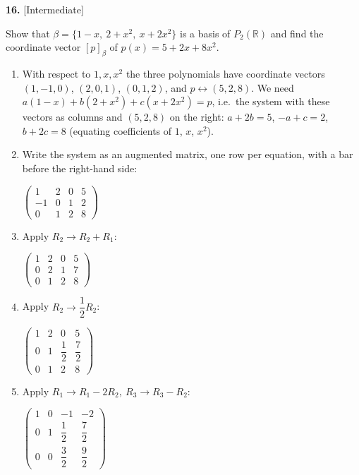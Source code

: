 \documentclass[11pt]{article}
\begin{document}
\par\vspace{2pt}
\begin{minipage}{\linewidth}\textbf{16.} \hfill{\scriptsize\color{ink}[Intermediate]}\par\nopagebreak Show that $\beta=\{1-x,\ 2+x^{2},\ x+2x^{2}\}$ is a basis of $P_2(\mathbb{R})$ and find the coordinate vector $[p]_\beta$ of $p(x)=5+2x+8x^{2}$.
\end{minipage}\par\nopagebreak
\begin{tcolorbox}[breakable,colback=ans,colframe=ansb,boxrule=0.5pt,left=4pt,right=4pt,top=2pt,bottom=2pt]\begin{enumerate}[leftmargin=3.1em,itemsep=1pt,topsep=1pt,label=\textbf{Step \arabic*.}]\item With respect to $1,x,x^{2}$ the three polynomials have coordinate vectors $(1,-1,0)$, $(2,0,1)$, $(0,1,2)$, and $p\leftrightarrow(5,2,8)$. We need $a(1-x)+b(2+x^{2})+c(x+2x^{2})=p$, i.e.\ the system with these vectors as columns and $(5,2,8)$ on the right: $a+2b=5$, $-a+c=2$, $b+2c=8$ (equating coefficients of $1$, $x$, $x^{2}$).
\item Write the system as an augmented matrix, one row per equation, with a bar before the right-hand side:\par\smallskip $\displaystyle \left(\begin{array}{ccc|c}1 & 2 & 0 & 5 \\ -1 & 0 & 1 & 2 \\ 0 & 1 & 2 & 8\end{array}\right)$
\item Apply $R_2\to R_2+R_1$:\par\smallskip $\displaystyle \left(\begin{array}{ccc|c}1 & 2 & 0 & 5 \\ 0 & 2 & 1 & 7 \\ 0 & 1 & 2 & 8\end{array}\right)$
\item Apply $R_2\to \dfrac{1}{2} R_2$:\par\smallskip $\displaystyle \left(\begin{array}{ccc|c}1 & 2 & 0 & 5 \\ 0 & 1 & \dfrac{1}{2} & \dfrac{7}{2} \\ 0 & 1 & 2 & 8\end{array}\right)$
\item Apply $R_1\to R_1-2R_2,\ R_3\to R_3-R_2$:\par\smallskip $\displaystyle \left(\begin{array}{ccc|c}1 & 0 & -1 & -2 \\ 0 & 1 & \dfrac{1}{2} & \dfrac{7}{2} \\ 0 & 0 & \dfrac{3}{2} & \dfrac{9}{2}\end{array}\right)$

\end{enumerate}
\end{tcolorbox}
\end{document}
